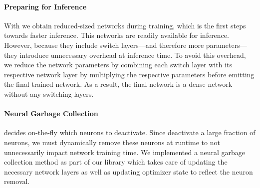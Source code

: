 % 

\paragraph{Preparing for Inference} With \shrink we obtain
reduced-sized networks during training, which is the first steps towards faster
inference. This networks are readily available for inference. However, because
they include switch layers---and therefore more parameters---they introduce
unnecessary overhead at inference time. To avoid this overhead, we reduce the
network parameters by combining each switch layer with its respective network
layer by multiplying the respective parameters before emitting the final trained
network. As a result, the final network is a dense network without any switching layers. 

\paragraph{Neural Garbage Collection} \shrink decides on-the-fly which
neurons to deactivate. Since \shrink deactivate a large fraction of neurons, we must
dynamically remove these neurons at runtime to not unnecessarily impact network
training time. We implemented a neural garbage collection method as part of our
library which takes care of updating the necessary network layers as well as
updating optimizer state to reflect the neuron removal.


